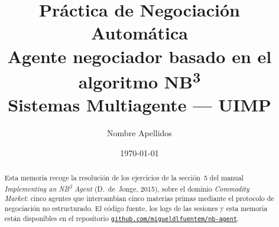 \documentclass[11pt,a4paper]{article}
\title{%
  \textbf{Práctica de Negociación Automática}\\[0.3em]
  \large Agente negociador basado en el algoritmo NB\textsuperscript{3}\\[0.2em]
  \large Sistemas Multiagente --- UIMP}
\author{Nombre Apellidos}  %
\date{\today}
\begin{document}
\maketitle

\begin{abstract}
  Esta memoria recoge la resolución de los ejercicios de la sección~5 del manual
  \emph{Implementing an NB\textsuperscript{3} Agent} (D.~de~Jonge, 2015), sobre el dominio
  \emph{Commodity Market}: cinco agentes que intercambian cinco materias primas mediante el
  protocolo de negociación no estructurado. El código fuente, los logs de las sesiones y esta
  memoria están disponibles en el repositorio
  \href{https://github.com/migueldlfuentem/nb-agent}{\nolinkurl{github.com/migueldlfuentem/nb-agent}}.
\end{abstract}

\tableofcontents
\newpage



% 
% 
\end{document}

